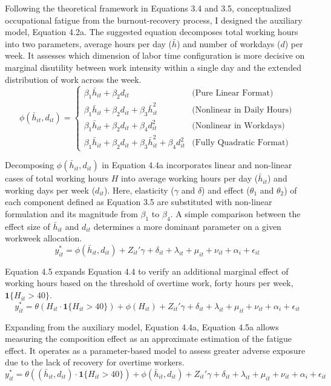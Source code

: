 \documentclass[
  12pt,
]{article}
\begin{document}
Following the theoretical framework in Equations 3.4 and 3.5,
conceptualized occupational fatigue from the burnout-recovery process, I
designed the auxiliary model, Equation 4.2a. The suggested equation
decomposes total working hours into two parameters, average hours per
day (\(\bar{h}\)) and number of workdays (\(d\)) per week. It assesses
which dimension of labor time configuration is more decisive on marginal
disutility between work intensity within a single day and the extended
distribution of work across the week. \[
\phi(\bar{h}_{it} , d_{it}) =
\begin{cases} 
\beta_1 \bar{h}_{it} + \beta_2 d_{it} & \text{(Pure Linear Format)} \\
\beta_1 \bar{h}_{it} + \beta_2 d_{it} + \beta_3 \bar{h}_{it}^2 & \text{(Nonlinear in Daily Hours)} \\
\beta_1 \bar{h}_{it} + \beta_2 d_{it} + \beta_4 d_{it}^2 & \text{(Nonlinear in Workdays)} \\
\beta_1 \bar{h}_{it} + \beta_2 d_{it}+ \beta_3 \bar{h}_{it}^2+ \beta_4 d_{it}^2 & \text{(Fully Quadratic Format)}
\end{cases}
\]

Decomposing \(\phi(\bar{h}_{it}, d_{it})\) in Equation 4.4a incorporates
linear and non-linear cases of total working hours \(H\) into average
working hours per day (\(\bar{h}_{it}\)) and working days per week
(\(d_{it}\)). Here, elasticity (\(\gamma\) and \(\delta\)) and effect
(\(\theta_1\) and \(\theta_2\)) of each component defined as Equation
3.5 are substituted with non-linear formulation and its magnitude from
\(\beta_1\) to \(\beta_4\). A simple comparison between the effect size
of \(\bar{h}_{it}\) and \(d_{it}\) determines a more dominant parameter
on a given workweek allocation. \[
y^*_{it} = \phi(\bar{h}_{it} , d_{it}) + Z_{it}' \gamma + \delta_{it} + \lambda_{it} + \mu_{it} + \nu_{it} +\alpha_i + \epsilon_{it}
\tag{4.4a}
\]

Equation 4.5 expands Equation 4.4 to verify an additional marginal
effect of working hours based on the threshold of overtime work, forty
hours per week, \(\mathbf{1}\{H_{it} > 40\}\). \[
y^*_{it} = \theta(H_{it} \cdot \mathbf{1}\{H_{it} > 40\}) + \phi(H_{it}) + Z_{it}' \gamma + \delta_{it} + \lambda_{it} + \mu_{it} + \nu_{it} +\alpha_i + \epsilon_{it}
\tag{4.5}
\]

Expanding from the auxiliary model, Equation 4.4a, Equation 4.5a allows
measuring the composition effect as an approximate estimation of the
fatigue effect. It operates as a parameter-based model to assess greater
adverse exposure due to the lack of recovery for overtime workers. \[
y^*_{it} = \theta((\bar{h}_{it}, d_{it}) \cdot \mathbf{1}\{H_{it} > 40\}) + \phi(\bar{h}_{it} , d_{it}) + Z_{it}' \gamma + \delta_{it}+ \lambda_{it} + \mu_{it} + \nu_{it} +\alpha_i + \epsilon_{it}
\tag{4.5a}
\]
\end{document}
